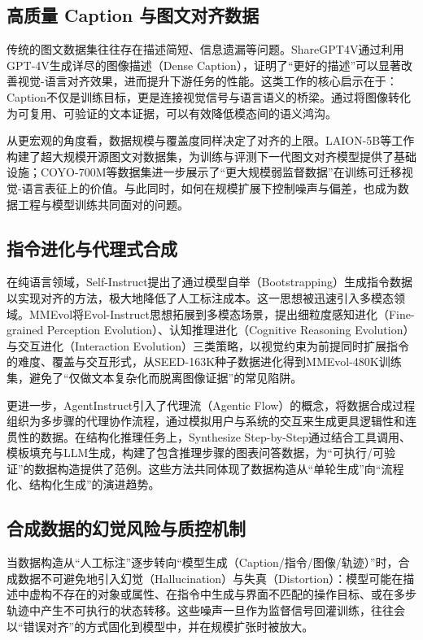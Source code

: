 \subsection{高质量 Caption 与图文对齐数据}
传统的图文数据集往往存在描述简短、信息遗漏等问题。ShareGPT4V通过利用GPT-4V生成详尽的图像描述（Dense Caption），证明了“更好的描述”可以显著改善视觉-语言对齐效果，进而提升下游任务的性能\citep{chen2023sharegpt4v}。这类工作的核心启示在于：Caption不仅是训练目标，更是连接视觉信号与语言语义的桥梁。通过将图像转化为可复用、可验证的文本证据，可以有效降低模态间的语义鸿沟。

从更宏观的角度看，数据规模与覆盖度同样决定了对齐的上限。LAION-5B等工作构建了超大规模开源图文对数据集，为训练与评测下一代图文对齐模型提供了基础设施\citep{schuhmann2022laion5b}；COYO-700M等数据集进一步展示了“更大规模弱监督数据”在训练可迁移视觉-语言表征上的价值\citep{byeon2022coyo}。与此同时，如何在规模扩展下控制噪声与偏差，也成为数据工程与模型训练共同面对的问题。

\subsection{指令进化与代理式合成}
在纯语言领域，Self-Instruct提出了通过模型自举（Bootstrapping）生成指令数据以实现对齐的方法，极大地降低了人工标注成本\citep{wang2023selfinstruct}。这一思想被迅速引入多模态领域。MMEvol将Evol-Instruct思想拓展到多模态场景，提出细粒度感知进化（Fine-grained Perception Evolution）、认知推理进化（Cognitive Reasoning Evolution）与交互进化（Interaction Evolution）三类策略，以视觉约束为前提同时扩展指令的难度、覆盖与交互形式，从SEED-163K种子数据进化得到MMEvol-480K训练集，避免了“仅做文本复杂化而脱离图像证据”的常见陷阱\citep{xu2024mmevol}。

更进一步，AgentInstruct引入了代理流（Agentic Flow）的概念，将数据合成过程组织为多步骤的代理协作流程，通过模拟用户与系统的交互来生成更具逻辑性和连贯性的数据\citep{mitra2024agentinstruct}。在结构化推理任务上，Synthesize Step-by-Step通过结合工具调用、模板填充与LLM生成，构建了包含推理步骤的图表问答数据，为“可执行/可验证”的数据构造提供了范例\citep{li2024synthesize}。这些方法共同体现了数据构造从“单轮生成”向“流程化、结构化生成”的演进趋势。

\subsection{合成数据的幻觉风险与质控机制}
当数据构造从“人工标注”逐步转向“模型生成（Caption/指令/图像/轨迹）”时，合成数据不可避免地引入幻觉（Hallucination）与失真（Distortion）：模型可能在描述中虚构不存在的对象或属性、在指令中生成与界面不匹配的操作目标、或在多步轨迹中产生不可执行的状态转移。这些噪声一旦作为监督信号回灌训练，往往会以“错误对齐”的方式固化到模型中，并在规模扩张时被放大。

